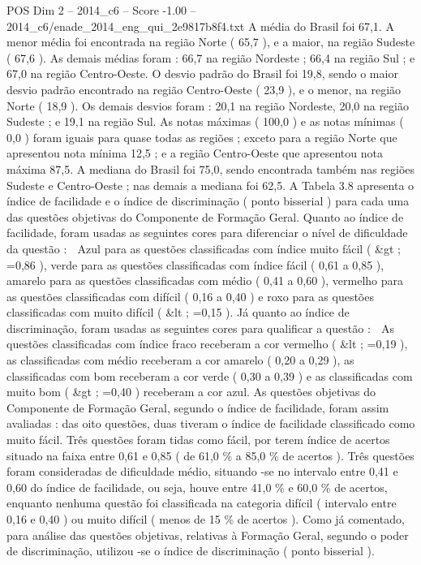 \begin{textsample}{POS Dim 2 – 2014\_c6 – Score -1.00 – 2014\_c6/enade\_2014\_eng\_qui\_2e9817b8f4.txt}
A média do Brasil foi 67,1.
A menor média foi encontrada na região Norte ( 65,7 ), e a maior, na região Sudeste ( 67,6 ).
As demais médias foram : 66,7 na região Nordeste ; 66,4 na região Sul ; e 67,0 na região Centro-Oeste.
O desvio padrão do Brasil foi 19,8, sendo o maior desvio padrão encontrado na região Centro-Oeste ( 23,9 ), e o menor, na região Norte ( 18,9 ).
Os demais desvios foram : 20,1 na região Nordeste, 20,0 na região Sudeste ; e 19,1 na região Sul.
As notas máximas ( 100,0 ) e as notas mínimas ( 0,0 ) foram iguais para quase todas as regiões ; exceto para a região Norte que apresentou nota mínima 12,5 ; e a região Centro-Oeste que apresentou nota máxima 87,5.
A mediana do Brasil foi 75,0, sendo encontrada também nas regiões Sudeste e Centro-Oeste ; nas demais a mediana foi 62,5.
A Tabela 3.8 apresenta o índice de facilidade e o índice de discriminação ( ponto bisserial ) para cada uma das questões objetivas do Componente de Formação Geral.
Quanto ao índice de facilidade, foram usadas as seguintes cores para diferenciar o nível de dificuldade da questão :  Azul para as questões classificadas com índice muito fácil ( \&gt ; =0,86 ), verde para as questões classificadas com índice fácil ( 0,61 a 0,85 ), amarelo para as questões classificadas com médio ( 0,41 a 0,60 ), vermelho para as questões classificadas com difícil ( 0,16 a 0,40 ) e roxo para as questões classificadas com muito difícil ( \&lt ; =0,15 ).
Já quanto ao índice de discriminação, foram usadas as seguintes cores para qualificar a questão :  As questões classificadas com índice fraco receberam a cor vermelho ( \&lt ; =0,19 ), as classificadas com médio receberam a cor amarelo ( 0,20 a 0,29 ), as classificadas com bom receberam a cor verde ( 0,30 a 0,39 ) e as classificadas com muito bom ( \&gt ; =0,40 ) receberam a cor azul.
As questões objetivas do Componente de Formação Geral, segundo o índice de facilidade, foram assim avaliadas : das oito questões, duas tiveram o índice de facilidade classificado como muito fácil.
Três questões foram tidas como fácil, por terem índice de acertos situado na faixa entre 0,61 e 0,85 ( de 61,0 \% a 85,0 \% de acertos ).
Três questões foram consideradas de dificuldade médio, situando -se no intervalo entre 0,41 e 0,60 do índice de facilidade, ou seja, houve entre 41,0 \% e 60,0 \% de acertos, enquanto nenhuma questão foi classificada na categoria difícil ( intervalo entre 0,16 e 0,40 ) ou muito difícil ( menos de 15 \% de acertos ).
Como já comentado, para análise das questões objetivas, relativas à Formação Geral, segundo o poder de discriminação, utilizou -se o índice de discriminação ( ponto bisserial ).

\end{textsample}
